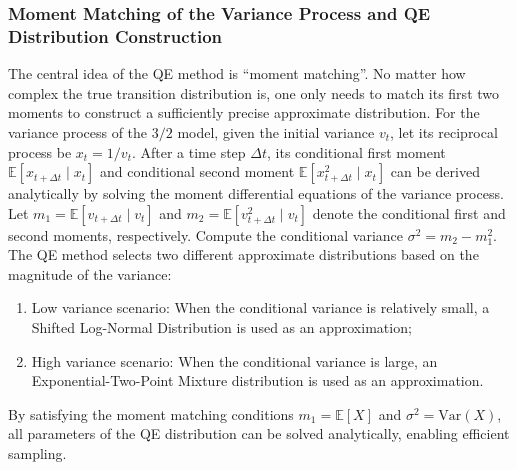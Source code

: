 \subsubsection{Moment Matching of the Variance Process and QE Distribution Construction}
The central idea of the QE method is ``moment matching''. No matter how complex the true transition distribution is, one only needs to match its first two moments to construct a sufficiently precise approximate distribution. For the variance process of the $3/2$ model, given the initial variance $v_t$, let its reciprocal process be $x_t = 1/v_t$. After a time step $\Delta t$, its conditional first moment $\mathbb{E}[x_{t+\Delta t} \mid x_t]$ and conditional second moment $\mathbb{E}[x_{t+\Delta t}^2 \mid x_t]$ can be derived analytically by solving the moment differential equations of the variance process.
Let $m_1 = \mathbb{E}[v_{t+\Delta t} \mid v_t]$ and $m_2 = \mathbb{E}[v_{t+\Delta t}^2 \mid v_t]$ denote the conditional first and second moments, respectively. Compute the conditional variance $\sigma^2 = m_2 - m_1^2$.
The QE method selects two different approximate distributions based on the magnitude of the variance:
\begin{enumerate}
  \item Low variance scenario: When the conditional variance is relatively small, a Shifted Log-Normal Distribution is used as an approximation;
  \item High variance scenario: When the conditional variance is large, an Exponential-Two-Point Mixture distribution is used as an approximation.
\end{enumerate}
By satisfying the moment matching conditions $m_1 = \mathbb{E}[X]$ and $\sigma^2 = \mathrm{Var}(X)$, all parameters of the QE distribution can be solved analytically, enabling efficient sampling.

